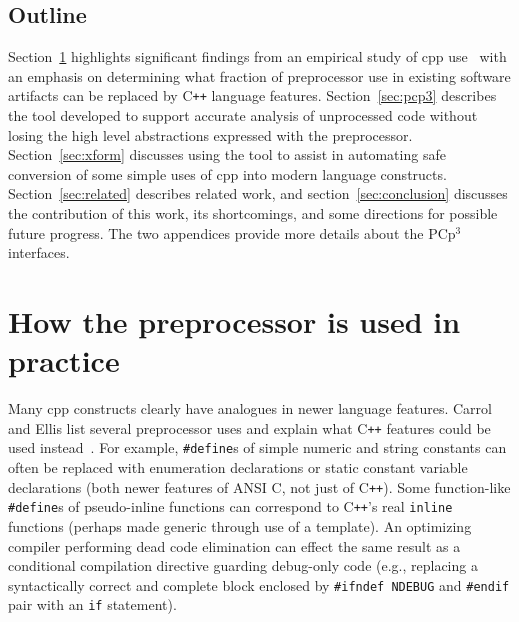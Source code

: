 \documentclass{article}
\newcommand{\pcp}{\mbox{\textsf{PCp}$^3$}}
\newcommand{\Cpp}{\mbox{\textsf{cpp}}}
\newcommand{\CPP}{\mbox{\textsf{C\texttt{++}}}}
\newcommand{\C}{\mbox{\textsf{C}}}
\newcommand{\ppd}[1]{\texttt{\##1}}
\begin{document}
\subsection{Outline}

Section~\ref{sec:feasibility} highlights significant findings from an
empirical study of \Cpp{} use~\cite{EmpCpp} with an emphasis on
determining what fraction of preprocessor use in existing software
artifacts can be replaced by \CPP{} language features.
Section~\ref{sec:pcp3} describes the tool developed to
support accurate analysis of unprocessed code without losing the high
level abstractions expressed with the preprocessor.  
Section~\ref{sec:xform} discusses using the tool to assist in automating
safe conversion of some simple uses of \Cpp{} into modern language constructs.
Section~\ref{sec:related} describes related work, and
section~\ref{sec:conclusion} discusses the contribution of this work, its
shortcomings, and some directions for possible future progress. The two appendices
provide more details about the \pcp{} interfaces.



\section{How the preprocessor is used in practice}
\label{sec:feasibility}
Many \Cpp{} constructs clearly have analogues in newer language
features.  Carrol and Ellis list several preprocessor uses and explain
what \CPP{} features could be used instead~\cite{Carroll95}. For
example, \ppd{define}s of simple numeric and string constants can often
be replaced with enumeration declarations or static constant variable
declarations (both newer features of ANSI \C{}, not just of \CPP{}).
Some function-like \ppd{define}s of pseudo-inline functions can
correspond to \CPP{}'s real \texttt{inline} functions (perhaps made
generic through use of a template).  An optimizing compiler performing
dead code elimination can effect the same result as a
conditional compilation directive guarding debug-only code (e.g.,
replacing a syntactically correct and complete block enclosed by
\texttt{\ppd{ifndef} NDEBUG} and \ppd{endif} pair with an \texttt{if}
statement).
\end{document}
